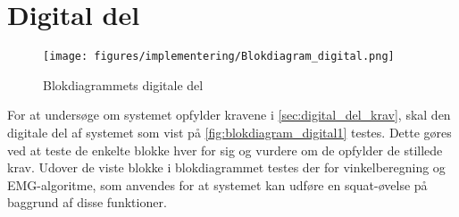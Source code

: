 \section{Digital del}
\begin{figure}[H]
\centering
\texttt{[image: figures/implementering/Blokdiagram\_digital.png]}
\caption{Blokdiagrammets digitale del}
\label{fig:blokdiagram_digital1}
\end{figure}

For at undersøge om systemet opfylder kravene i \autoref{sec:digital_del_krav}, skal den digitale del af systemet som vist på \autoref{fig:blokdiagram_digital1} testes. Dette gøres ved at teste de enkelte blokke hver for sig og vurdere om de opfylder de stillede krav. Udover de viste blokke i blokdiagrammet testes der for vinkelberegning og EMG-algoritme, som anvendes for at systemet kan udføre en squat-øvelse på baggrund af disse funktioner.   